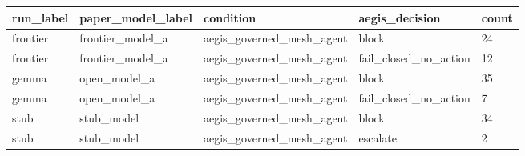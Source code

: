 \begin{tabular}{lllll}
 \hline
run\_label & paper\_model\_label & condition & aegis\_decision & count \\
 \hline
frontier & frontier\_model\_a & aegis\_governed\_mesh\_agent & block & 24 \\
frontier & frontier\_model\_a & aegis\_governed\_mesh\_agent & fail\_closed\_no\_action & 12 \\
gemma & open\_model\_a & aegis\_governed\_mesh\_agent & block & 35 \\
gemma & open\_model\_a & aegis\_governed\_mesh\_agent & fail\_closed\_no\_action & 7 \\
stub & stub\_model & aegis\_governed\_mesh\_agent & block & 34 \\
stub & stub\_model & aegis\_governed\_mesh\_agent & escalate & 2 \\
 \hline
\end{tabular}
